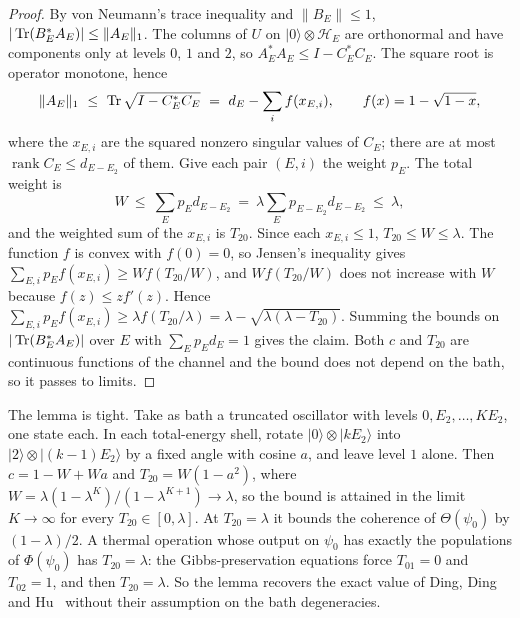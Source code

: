 \begin{proof}
By von Neumann's trace inequality and $\|B_E\|\le1$, $|\operatorname{Tr}(B_E^*A_E)|\le\|A_E\|_1$. The columns of $U$ on $|0\rangle\otimes\mathcal H_E$ are orthonormal and have components only at levels $0$, $1$ and $2$, so $A_E^*A_E\le I-C_E^*C_E$. The square root is operator monotone, hence
\[
\|A_E\|_1\ \le\ \Tr\sqrt{I-C_E^*C_E}\ =\ d_E-\sum_if(x_{E,i}),\qquad f(x)=1-\sqrt{1-x},
\]
where the $x_{E,i}$ are the squared nonzero singular values of $C_E$; there are at most $\operatorname{rank}C_E\le d_{E-E_2}$ of them. Give each pair $(E,i)$ the weight $p_E$. The total weight is
\[
W\ \le\ \sum_Ep_Ed_{E-E_2}\ =\ \lambda\sum_Ep_{E-E_2}d_{E-E_2}\ \le\ \lambda,
\]
and the weighted sum of the $x_{E,i}$ is $T_{20}$. Since each $x_{E,i}\le1$, $T_{20}\le W\le\lambda$. The function $f$ is convex with $f(0)=0$, so Jensen's inequality gives $\sum_{E,i}p_Ef(x_{E,i})\ge Wf(T_{20}/W)$, and $Wf(T_{20}/W)$ does not increase with $W$ because $f(z)\le zf'(z)$. Hence $\sum_{E,i}p_Ef(x_{E,i})\ge\lambda f(T_{20}/\lambda)=\lambda-\sqrt{\lambda(\lambda-T_{20})}$. Summing the bounds on $|\operatorname{Tr}(B_E^*A_E)|$ over $E$ with $\sum_Ep_Ed_E=1$ gives the claim. Both $c$ and $T_{20}$ are continuous functions of the channel and the bound does not depend on the bath, so it passes to limits.
\end{proof}

The lemma is tight. Take as bath a truncated oscillator with levels $0,E_2,\dots,KE_2$, one state each. In each total-energy shell, rotate $|0\rangle\otimes|kE_2\rangle$ into $|2\rangle\otimes|(k-1)E_2\rangle$ by a fixed angle with cosine $a$, and leave level $1$ alone. Then $c=1-W+Wa$ and $T_{20}=W(1-a^2)$, where $W=\lambda(1-\lambda^K)/(1-\lambda^{K+1})\to\lambda$, so the bound is attained in the limit $K\to\infty$ for every $T_{20}\in[0,\lambda]$. At $T_{20}=\lambda$ it bounds the coherence of $\Theta(\psi_0)$ by $(1-\lambda)/2$. A thermal operation whose output on $\psi_0$ has exactly the populations of $\Phi(\psi_0)$ has $T_{20}=\lambda$: the Gibbs-preservation equations force $T_{01}=0$ and $T_{02}=1$, and then $T_{20}=\lambda$. So the lemma recovers the exact value of Ding, Ding and Hu~\cite{DingFengHu21} without their assumption on the bath degeneracies.

